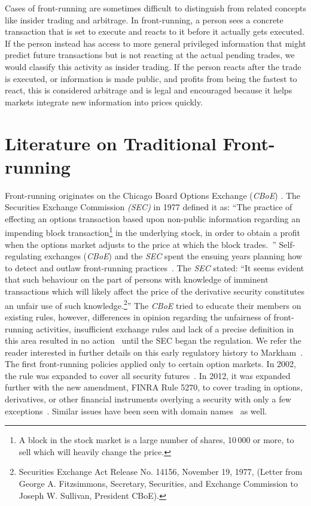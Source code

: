 Cases of front-running are sometimes difficult to distinguish from related concepts like insider trading and arbitrage. In front-running, a person sees a concrete transaction that is set to execute and reacts to it before it actually gets executed. If the person instead has access to more general privileged information that might predict future transactions but is not reacting at the actual pending trades, we would classify this activity as insider trading. If the person reacts after the trade is executed, or information is made public, and profits from being the fastest to react, this is considered arbitrage and is legal and encouraged because it helps markets integrate new information into prices quickly.

\section{Literature on Traditional Front-running}\label{traditionalFrontrunning}
Front-running originates on the Chicago Board Options Exchange (\textit{CBoE}) \cite{markham1988front}. The Securities Exchange Commission \textit{(SEC)} in 1977 defined it as: ``The practice of effecting an options transaction based upon non-public information regarding an impending block transaction\footnote{A block in the stock market is a large number of shares, 10\,000 or more, to sell which will heavily change the price.} in the underlying stock, in order to obtain a profit when the options market adjusts to the price at which the block trades.~\cite{sec1978optionsmarket}'' Self-regulating exchanges (\eg \textit{CBoE}) and the \textit{SEC} spent the ensuing years planning how to detect and outlaw front-running practices~\cite{markham1988front}. The \textit{SEC} stated: ``It seems evident that such behaviour on the part of persons with knowledge of imminent transactions which will likely affect the price of the derivative security constitutes an unfair use of such knowledge.\footnote{Securities Exchange Act Release No. 14156, November 19, 1977, (Letter from George A. Fitzsimmons, Secretary, Securities, and Exchange Commission to Joseph W. Sullivan, President  CBoE).}'' The \textit{CBoE} tried to educate their members on existing rules, however, differences in opinion regarding the unfairness of front-running activities, insufficient exchange rules and lack of a precise definition in this area resulted in no action~\cite{sec1978optionsmarket} until the SEC began the regulation. We refer the reader interested in further details on this early regulatory history to Markham~\cite{markham1988front}. The first front-running policies applied only to certain option markets. In 2002, the rule was expanded to cover all security futures~\cite{finra_2002}. In 2012, it was expanded further with the new amendment, FINRA Rule 5270, to cover trading in options, derivatives, or other financial instruments overlying a security with only a few exceptions~\cite{sec2012frontrunning,finra_2012}. Similar issues have been seen with domain names~\cite{sac022en33:online,edelman2009front} as well.



